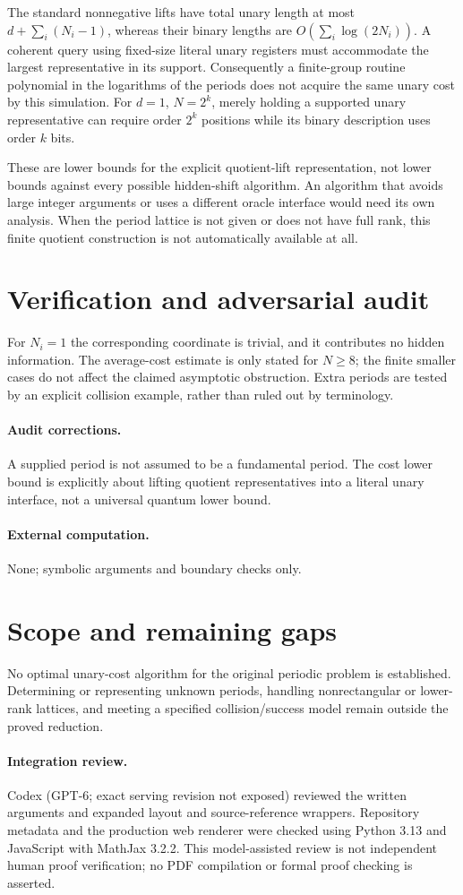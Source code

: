\documentclass[11pt]{article}
\begin{document}
The standard nonnegative lifts have total unary length at most $d+\sum_i(N_i-1)$, whereas their binary lengths are $O(\sum_i\log(2N_i))$. A coherent query using fixed-size literal unary registers must accommodate the largest representative in its support. Consequently a finite-group routine polynomial in the logarithms of the periods does not acquire the same unary cost by this simulation. For $d=1$, $N=2^k$, merely holding a supported unary representative can require order $2^k$ positions while its binary description uses order $k$ bits.

These are lower bounds for the explicit quotient-lift representation, not lower bounds against every possible hidden-shift algorithm. An algorithm that avoids large integer arguments or uses a different oracle interface would need its own analysis. When the period lattice is not given or does not have full rank, this finite quotient construction is not automatically available at all.
\section{Verification and adversarial audit}
For $N_i=1$ the corresponding coordinate is trivial, and it contributes no hidden information. The average-cost estimate is only stated for $N\geq8$; the finite smaller cases do not affect the claimed asymptotic obstruction. Extra periods are tested by an explicit collision example, rather than ruled out by terminology.
\paragraph{Audit corrections.} A supplied period is not assumed to be a fundamental period. The cost lower bound is explicitly about lifting quotient representatives into a literal unary interface, not a universal quantum lower bound.
\paragraph{External computation.} None; symbolic arguments and boundary checks only.
\section{Scope and remaining gaps}
No optimal unary-cost algorithm for the original periodic problem is established. Determining or representing unknown periods, handling nonrectangular or lower-rank lattices, and meeting a specified collision/success model remain outside the proved reduction.
\paragraph{Integration review.} Codex (GPT-6; exact serving revision not exposed) reviewed the written arguments and expanded layout and source-reference wrappers. Repository metadata and the production web renderer were checked using Python 3.13 and JavaScript with MathJax 3.2.2. This model-assisted review is not independent human proof verification; no PDF compilation or formal proof checking is asserted.
\end{document}
